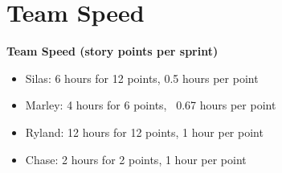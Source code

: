 \section{Team Speed}
\textbf{Team Speed (story points per sprint)}
\begin{itemize}
    \item Silas: 6 hours for 12 points, 0.5 hours per point
    \item Marley: 4 hours for 6 points, ~0.67 hours per point
    \item Ryland: 12 hours for 12 points, 1 hour per point
    \item Chase: 2 hours for 2 points, 1 hour per point
\end{itemize}